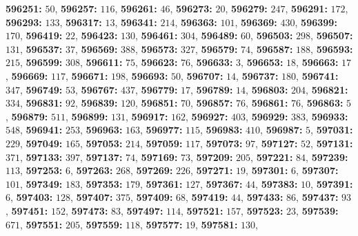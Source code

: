 \textsf{\bfseries 596251:} $50$, \textsf{\bfseries 596257:} $116$, \textsf{\bfseries 596261:} $46$, \textsf{\bfseries 596273:} $20$, \textsf{\bfseries 596279:} $247$, \textsf{\bfseries 596291:} $172$, \textsf{\bfseries 596293:} $133$, \textsf{\bfseries 596317:} $13$, \textsf{\bfseries 596341:} $214$, \textsf{\bfseries 596363:} $101$, \textsf{\bfseries 596369:} $430$, \textsf{\bfseries 596399:} $170$, \textsf{\bfseries 596419:} $22$, \textsf{\bfseries 596423:} $130$, \textsf{\bfseries 596461:} $304$, \textsf{\bfseries 596489:} $60$, \textsf{\bfseries 596503:} $298$, \textsf{\bfseries 596507:} $131$, \textsf{\bfseries 596537:} $37$, \textsf{\bfseries 596569:} $388$, \textsf{\bfseries 596573:} $327$, \textsf{\bfseries 596579:} $74$, \textsf{\bfseries 596587:} $188$, \textsf{\bfseries 596593:} $215$, \textsf{\bfseries 596599:} $308$, \textsf{\bfseries 596611:} $75$, \textsf{\bfseries 596623:} $76$, \textsf{\bfseries 596633:} $3$, \textsf{\bfseries 596653:} $18$, \textsf{\bfseries 596663:} $17$, \textsf{\bfseries 596669:} $117$, \textsf{\bfseries 596671:} $198$, \textsf{\bfseries 596693:} $50$, \textsf{\bfseries 596707:} $14$, \textsf{\bfseries 596737:} $180$, \textsf{\bfseries 596741:} $347$, \textsf{\bfseries 596749:} $53$, \textsf{\bfseries 596767:} $437$, \textsf{\bfseries 596779:} $17$, \textsf{\bfseries 596789:} $14$, \textsf{\bfseries 596803:} $204$, \textsf{\bfseries 596821:} $334$, \textsf{\bfseries 596831:} $92$, \textsf{\bfseries 596839:} $120$, \textsf{\bfseries 596851:} $70$, \textsf{\bfseries 596857:} $76$, \textsf{\bfseries 596861:} $76$, \textsf{\bfseries 596863:} $5$, \textsf{\bfseries 596879:} $511$, \textsf{\bfseries 596899:} $131$, \textsf{\bfseries 596917:} $162$, \textsf{\bfseries 596927:} $403$, \textsf{\bfseries 596929:} $383$, \textsf{\bfseries 596933:} $548$, \textsf{\bfseries 596941:} $253$, \textsf{\bfseries 596963:} $163$, \textsf{\bfseries 596977:} $115$, \textsf{\bfseries 596983:} $410$, \textsf{\bfseries 596987:} $5$, \textsf{\bfseries 597031:} $229$, \textsf{\bfseries 597049:} $165$, \textsf{\bfseries 597053:} $214$, \textsf{\bfseries 597059:} $117$, \textsf{\bfseries 597073:} $97$, \textsf{\bfseries 597127:} $52$, \textsf{\bfseries 597131:} $371$, \textsf{\bfseries 597133:} $397$, \textsf{\bfseries 597137:} $74$, \textsf{\bfseries 597169:} $73$, \textsf{\bfseries 597209:} $205$, \textsf{\bfseries 597221:} $84$, \textsf{\bfseries 597239:} $113$, \textsf{\bfseries 597253:} $6$, \textsf{\bfseries 597263:} $268$, \textsf{\bfseries 597269:} $226$, \textsf{\bfseries 597271:} $19$, \textsf{\bfseries 597301:} $6$, \textsf{\bfseries 597307:} $101$, \textsf{\bfseries 597349:} $183$, \textsf{\bfseries 597353:} $179$, \textsf{\bfseries 597361:} $127$, \textsf{\bfseries 597367:} $44$, \textsf{\bfseries 597383:} $10$, \textsf{\bfseries 597391:} $6$, \textsf{\bfseries 597403:} $128$, \textsf{\bfseries 597407:} $375$, \textsf{\bfseries 597409:} $68$, \textsf{\bfseries 597419:} $44$, \textsf{\bfseries 597433:} $86$, \textsf{\bfseries 597437:} $93$, \textsf{\bfseries 597451:} $152$, \textsf{\bfseries 597473:} $83$, \textsf{\bfseries 597497:} $114$, \textsf{\bfseries 597521:} $157$, \textsf{\bfseries 597523:} $23$, \textsf{\bfseries 597539:} $671$, \textsf{\bfseries 597551:} $205$, \textsf{\bfseries 597559:} $118$, \textsf{\bfseries 597577:} $19$, \textsf{\bfseries 597581:} $130$, 

